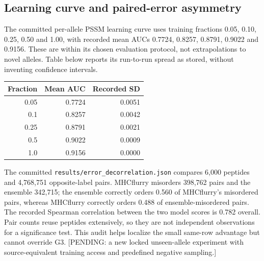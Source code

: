 \subsection{Learning curve and paired-error asymmetry}
The committed per-allele PSSM learning curve uses training fractions 0.05, 0.10, 0.25, 0.50 and 1.00, with recorded mean AUCs 0.7724, 0.8257, 0.8791, 0.9022 and 0.9156. These are within its chosen evaluation protocol, not extrapolations to novel alleles. Table below reports its run-to-run spread as stored, without inventing confidence intervals.
\begin{center}\begin{tabular}{rrr}\hline Fraction & Mean AUC & Recorded SD\\\hline
0.05 & 0.7724 & 0.0051\\
0.1 & 0.8257 & 0.0042\\
0.25 & 0.8791 & 0.0021\\
0.5 & 0.9022 & 0.0009\\
1.0 & 0.9156 & 0.0000\\
\hline\end{tabular}\end{center}
The committed \texttt{results/error\_decorrelation.json} compares 6,000 peptides and 4,768,751 opposite-label pairs. MHCflurry misorders 398,762 pairs and the ensemble 342,715; the ensemble correctly orders 0.560 of MHCflurry's misordered pairs, whereas MHCflurry correctly orders 0.488 of ensemble-misordered pairs. The recorded Spearman correlation between the two model scores is 0.782 overall. Pair counts reuse peptides extensively, so they are not independent observations for a significance test. This audit helps localize the small same-row advantage but cannot override G3. [PENDING: a new locked unseen-allele experiment with source-equivalent training access and predefined negative sampling.]
